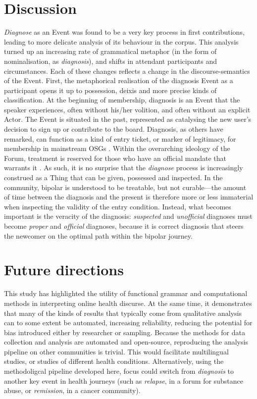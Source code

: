 \documentclass{article}
\renewcommand{\cite}{\parencite}
\begin{document}
\section{Discussion}

\emph{Diagnose} as an Event was found to be a very key process in first contributions, leading to more delicate analysis of its behaviour in the corpus. This analysis turned up an increasing rate of grammatical metaphor (in the form of nominalisation, as \emph{diagnosis}), and shifts in attendant participants and circumstances. Each of these changes reflects a change in the discourse-semantics of the Event. First, the metaphorical realisation of the diagnosis Event as a participant opens it up to possession, deixis and more precise kinds of classification. At the beginning of membership, diagnosis is an Event that the speaker experiences, often without his\slash her volition, and often without an explicit Actor. The Event is situated in the past, represented as catalysing the new user's decision to sign up or contribute to the board. Diagnosis, as others have remarked, can function as a kind of entry ticket, or marker of legitimacy, for membership in mainstream OSGs \cite{stommel_use_2011}. Within the overarching ideology of the Forum, treatment \cite[including the talk therapy provided by Forum interaction itself---see][]{kaufman2016producing} is reserved for those who have an official mandate that warrants it \cite{vayreda_social_2009}. As such, it is no surprise that the \emph{diagnose} process is increasingly construed as a Thing that can be given, possessed and inspected. In the community, bipolar is understood to be treatable, but not curable---the amount of time between the diagnosis and the present is therefore more or less immaterial when inspecting the validity of the entry condition. Instead, what becomes important is the veracity of the diagnosis: \emph{suspected} and \emph{unofficial} diagnoses must become \emph{proper} and \emph{official} diagnoses, because it is correct diagnosis that steers the newcomer on the optimal path within the bipolar journey.

\section{Future directions}

This study has highlighted the utility of functional grammar and computational methods in interpreting online health discurse. At the same time, it demonstrates that many of the kinds of results that typically come from qualitative analysis can to some extent be automated, increasing reliability, reducing the potential for bias introduced either by researcher or sampling. Because the methods for data collection and analysis are automated and open-source, reproducing the analysis pipeline on other communities is trivial. This would facilitate multilingual studies, or studies of different health conditions. Alternatively, using the methodoligcal pipeline developed here, focus could switch from \emph{diagnosis} to another key event in health journeys (such as \emph{relapse}, in a forum for substance abuse, or \emph{remission}, in a cancer community).
\end{document}

